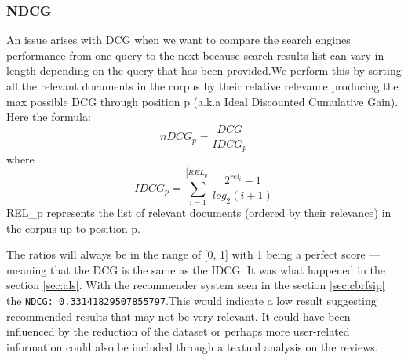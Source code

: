\documentclass[12pt,english]{report}
\begin{document}
\subsubsection{NDCG}
An issue arises with DCG when we want to compare the search engines performance from one query to the next because search results list can vary in length depending on the query that has been provided.We perform this by sorting all the relevant documents in the corpus by their relative relevance producing the max possible DCG through position p (a.k.a Ideal Discounted Cumulative Gain). Here the formula:
$$nDCG_{p} = \frac{DCG}{IDCG_{p}}$$ where 
$$IDCG_{p} = \sum_{i=1}^{|REL_{p}|} \frac{2^{rel_{i}} - 1}{log_{2}(i+1)}$$
REL\_p represents the list of relevant documents (ordered by their relevance) in the corpus up to position p.\par
The ratios will always be in the range of [0, 1] with 1 being a perfect score — meaning that the DCG is the same as the IDCG.  It was what happened in the section \ref{sec:als}. With the recommender system seen in the section \ref{sec:cbrfsip} the \texttt{NDCG: 0.33141829507855797}.This would indicate a low result suggesting recommended results that may not be very relevant. It could have been influenced by the reduction of the dataset or perhaps more user-related information could also be included through a textual analysis on the reviews.



\lstlistoflistings
\listoffigures
\listoftables


\end{document}
